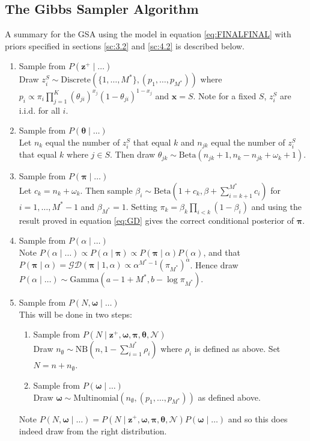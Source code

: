 \documentclass[10pt,a4paper,notitlepage]{article}
\newcommand{\x}{\textbf{x}}
\begin{document}
\subsection{The Gibbs Sampler Algorithm}\label{sc:MCMC}
A summary for the GSA using the model in equation \eqref{eq:FINALFINAL} with priors specified in sections \ref{sc:3.2} and \ref{sc:4.2} is described below.
\begin{enumerate}
\item Sample from $P(\mathbf{z}^{+}\mid \hdots)$\\ 
Draw $z^{S}_{i}\sim \text{Discrete}(\{1,\hdots,M^{*}\},(p_{1},\hdots,p_{M^{*}}))$ where $p_{i}\propto \pi_{i}\prod _{j=1}^{K}(\theta_{ji})^{x_{j}}(1-\theta_{ji})^{1-x_{j}}$ and $\x=S$. Note for a fixed $S$, $z^{S}_{i}$ are i.i.d. for all $i$.
\item Sample from $P(\bm{\theta}\mid\hdots)$\\
Let $n_{k}$ equal the number of $z_{i}^{S}$ that equal $k$ and $n_{jk}$ equal the number of $z_{i}^{S}$ that equal $k$ where $j\in S$. Then draw $\theta_{jk}\sim \text{Beta}(n_{jk}+1,n_{k}-n_{jk}+\omega_{k}+1)$.
\item  Sample from $P(\bm{\pi}\mid\hdots)$\\
Let $c_{k}=n_{k}+\omega_{k}$. Then sample $\beta_{i}\sim \text{Beta}(1+c_{k},\beta+\sum_{i=k+1}^{M^{*}}c_{i})$ for $i=1,\hdots,M^{*}-1$ and $\beta_{M^{*}}=1$. Setting $\pi_{k}=\beta_{k}\prod_{i<k}(1-\beta_{i})$ and using the result proved in equation \eqref{eq:GD} gives the correct conditional posterior of $\bm{\pi}$.
\item Sample from $P(\alpha \mid \hdots)$\\
Note $P(\alpha\mid\hdots)\propto P(\alpha\mid\bm{\pi})\propto P(\bm{\pi}\mid\alpha)P(\alpha)$, and that $P(\bm{\pi}\mid\alpha)=\mathcal{GD}(\bm{\pi}\mid 1, \alpha)\propto \alpha^{M^{*}-1}(\pi_{M^{*}})^{\alpha}$. Hence draw $P(\alpha\mid\hdots)\sim \text{Gamma}(a-1+M^{*},b-\log\pi_{M^{*}})$.
\item Sample from $P(N,\bm{\omega}\mid \hdots)$\\
This will be done in two steps:
\begin{enumerate}
\item Sample from $P(N\mid \mathbf{z^{+}},\bm{\omega},\bm{\pi},\bm{\theta},\mathcal{N})$\\
Draw $n_{\emptyset}\sim\text{NB}(n,1-\sum_{i=1}^{M^{*}}\rho_{i})$ where $\rho_{i}$ is defined as above. Set $N=n+n_{\emptyset}$.
\item Sample from $P(\bm{\omega}\mid \hdots)$\\
Draw $\bm{\omega}\sim\text{Multinomial}(n_{\emptyset},(p_{1},\hdots,p_{M^{*}}))$ as defined above.
\end{enumerate}
Note $P(N,\bm{\omega}\mid\hdots)=P(N\mid \mathbf{z^{+}},\bm{\omega},\bm{\pi},\bm{\theta},\mathcal{N})P(\bm{\omega}\mid \hdots)$ and so this does indeed draw from the right distribution.
\end{enumerate}
\end{document}
